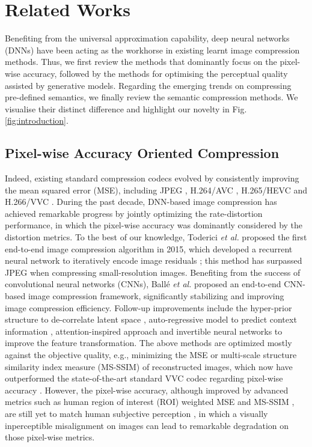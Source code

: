 \section{Related Works}
{Benefiting from the universal approximation capability, deep neural networks (DNNs) have been acting as the workhorse in existing learnt image compression methods. Thus, we first review the methods that dominantly focus on the pixel-wise accuracy, followed by the methods for optimising the perceptual quality assisted by generative models. Regarding the emerging trends on compressing pre-defined semantics, we finally review the semantic compression methods. We visualise their distinct difference and highlight our novelty  in Fig. \ref{fig:introduction}.}

\subsection{Pixel-wise Accuracy Oriented Compression}

{Indeed, existing standard compression codecs evolved by consistently improving the mean squared error (MSE), including JPEG \cite{marcellin2000overview}, H.264/AVC \cite{wiegand2003overview}, H.265/HEVC \cite{sullivan2012overview} and H.266/VVC \cite{bross2021overview}. During the past decade, DNN-based image compression has achieved remarkable progress by jointly optimizing the rate-distortion performance, in which the pixel-wise accuracy was dominantly considered by the distortion metrics. To the best of our knowledge, Toderici \textit{et al.} proposed the first end-to-end image compression algorithm in 2015, which developed a recurrent neural network to iteratively encode image residuals \cite{toderici2015variable}; this method has surpassed JPEG when compressing small-resolution images. Benefiting from the success of convolutional neural networks (CNNs), Ball{\'e} \textit{et al.} \cite{balle2017end} proposed an end-to-end CNN-based image compression framework, significantly stabilizing and improving image compression efficiency. Follow-up improvements include the hyper-prior structure to de-correlate latent space \cite{balle2018variational}, auto-regressive model to predict context information \cite{minnen2018joint}, attention-inspired approach \cite{cheng2020learned} and invertible neural networks \cite{xie2021enhanced} to improve the feature transformation. The above methods are optimized mostly against the objective quality, e.g., minimizing the MSE or multi-scale structure similarity index measure (MS-SSIM) \cite{wang2004image,wang2003multiscale} of reconstructed images, which now have outperformed the state-of-the-art standard VVC codec regarding pixel-wise accuracy \cite{he2022elic}. However, the pixel-wise accuracy, although improved by advanced metrics such as human region of interest (ROI) weighted MSE and MS-SSIM \cite{wang2003multiscale}, are still yet to match human subjective perception \cite{kim2017deep}, in which a visually inperceptible misalignment on images can lead to remarkable degradation on those pixel-wise metrics. }

